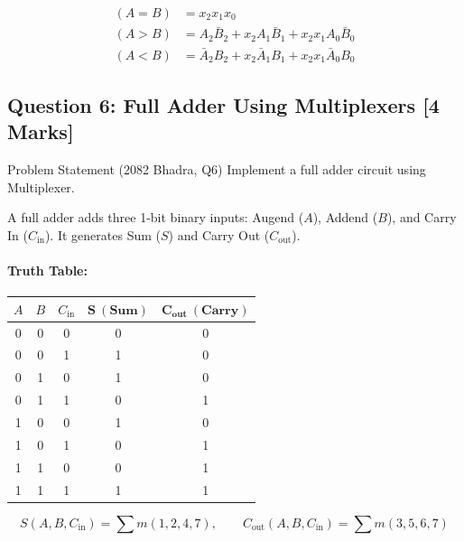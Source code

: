 \documentclass[11pt,a4paper,oneside]{book}
\begin{document}
\begin{answerbox}
\begin{align*}
(A = B) &= x_2 x_1 x_0 \\
(A > B) &= A_2 \bar{B}_2 + x_2 A_1 \bar{B}_1 + x_2 x_1 A_0 \bar{B}_0 \\
(A < B) &= \bar{A}_2 B_2 + x_2 \bar{A}_1 B_1 + x_2 x_1 \bar{A}_0 B_0
\end{align*}
\end{answerbox}

\vspace{0.6cm}

\subsection{Question 6: Full Adder Using Multiplexers [4 Marks]}
\begin{questionbox}{Problem Statement (2082 Bhadra, Q6)}
Implement a full adder circuit using Multiplexer.
\end{questionbox}

A full adder adds three 1-bit binary inputs: Augend ($A$), Addend ($B$), and Carry In ($C_{\text{in}}$). It generates Sum ($S$) and Carry Out ($C_{\text{out}}$).

\paragraph{Truth Table:}
\begin{center}
\begin{tabular}{|ccc||cc|}
\hline
$A$ & $B$ & $C_{\text{in}}$ & $\mathbf{S\ (Sum)}$ & $\mathbf{C_{\text{out}}\ (Carry)}$ \\ \hline
0 & 0 & 0 & 0 & 0 \\ \hline
0 & 0 & 1 & 1 & 0 \\ \hline
0 & 1 & 0 & 1 & 0 \\ \hline
0 & 1 & 1 & 0 & 1 \\ \hline
1 & 0 & 0 & 1 & 0 \\ \hline
1 & 0 & 1 & 0 & 1 \\ \hline
1 & 1 & 0 & 0 & 1 \\ \hline
1 & 1 & 1 & 1 & 1 \\ \hline
\end{tabular}
\end{center}
\[
S(A,B,C_{\text{in}}) = \sum m(1, 2, 4, 7), \qquad C_{\text{out}}(A,B,C_{\text{in}}) = \sum m(3, 5, 6, 7)
\]
\end{document}
